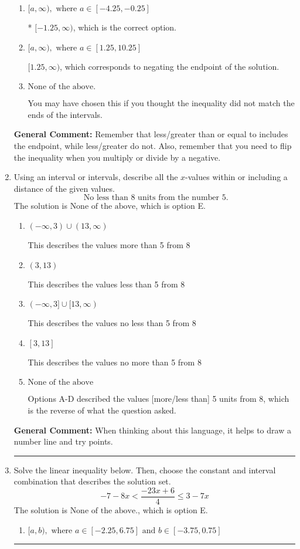 \documentclass{extbook}[14pt]
\newcommand{\litem}[1]{\item #1

\rule{\textwidth}{0.4pt}}
\begin{document}
\begin{enumerate}
{\begin{enumerate}[label=\Alph*.]
 $(-\infty, 1.25]$, which corresponds to switching the direction of the interval AND negating the endpoint. You likely did this if you did not flip the inequality when dividing by a negative as well as not moving values over to a side properly.
\item \( [a, \infty), \text{ where } a \in [-4.25, -0.25] \)

* $[-1.25, \infty)$, which is the correct option.
\item \( [a, \infty), \text{ where } a \in [1.25, 10.25] \)

 $[1.25, \infty)$, which corresponds to negating the endpoint of the solution.
\item \( \text{None of the above}. \)

You may have chosen this if you thought the inequality did not match the ends of the intervals.
\end{enumerate}

\textbf{General Comment:} Remember that less/greater than or equal to includes the endpoint, while less/greater do not. Also, remember that you need to flip the inequality when you multiply or divide by a negative.
}
\litem{
Using an interval or intervals, describe all the $x$-values within or including a distance of the given values.
\[ \text{ No less than } 8 \text{ units from the number } 5. \]The solution is \( \text{None of the above} \), which is option E.\begin{enumerate}[label=\Alph*.]
\item \( (-\infty, 3) \cup (13, \infty) \)

This describes the values more than 5 from 8
\item \( (3, 13) \)

This describes the values less than 5 from 8
\item \( (-\infty, 3] \cup [13, \infty) \)

This describes the values no less than 5 from 8
\item \( [3, 13] \)

This describes the values no more than 5 from 8
\item \( \text{None of the above} \)

Options A-D described the values [more/less than] 5 units from 8, which is the reverse of what the question asked.
\end{enumerate}

\textbf{General Comment:} When thinking about this language, it helps to draw a number line and try points.
}
\litem{
Solve the linear inequality below. Then, choose the constant and interval combination that describes the solution set.
\[ -7 - 8 x < \frac{-23 x + 6}{4} \leq 3 - 7 x \]The solution is \( \text{None of the above.} \), which is option E.\begin{enumerate}[label=\Alph*.]
\item \( [a, b), \text{ where } a \in [-2.25, 6.75] \text{ and } b \in [-3.75, 0.75] \)


\end{enumerate}}
\end{enumerate}
\end{document}
